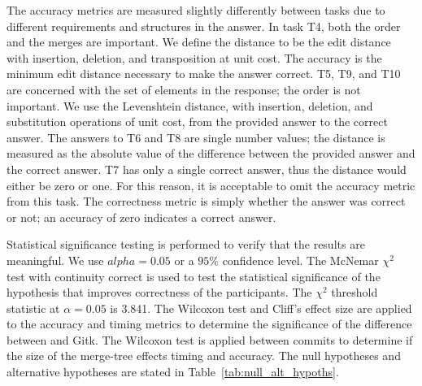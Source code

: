 The accuracy metrics are measured slightly differently between tasks due
to different requirements and structures in the answer. In task T4, both
the order and the merges are important. We define the distance to be the
edit distance with insertion, deletion, and transposition at unit cost.
The accuracy is the minimum edit distance necessary to make the answer
correct. T5, T9, and T10 are concerned with the set of elements in the
response; the order is not important. We use the Levenshtein distance,
with insertion, deletion, and substitution operations of unit cost, from
the provided answer to the correct answer. The answers to T6 and T8 are
single number values; the distance is measured as the absolute value of
the difference between the provided answer and the correct answer. T7
has only a single correct answer, thus the distance would either be zero
or one. For this reason, it is acceptable to omit the accuracy metric
from this task. The correctness metric is simply whether the answer was
correct or not; an accuracy of zero indicates a correct answer.

Statistical significance testing is performed to verify that the results
are meaningful. We use $alpha = 0.05$ or a $95\%$ confidence level. The
McNemar $\chi^2$ test\cite{McNemar1947} with continuity correct is used
to test the statistical significance of the hypothesis that \tool
improves correctness of the participants. The $\chi^2$ threshold
statistic at $\alpha = 0.05$ is 3.841. The Wilcoxon\cite{Wilcoxon45}
test and Cliff's effect size\cite{Cliff93} are applied to the accuracy
and timing metrics to determine the significance of the difference
between \tool and Gitk. The Wilcoxon test is applied between commits to
determine if the size of the merge-tree effects timing and accuracy. The
null hypotheses and alternative hypotheses are stated in
Table~\ref{tab:null_alt_hypoths}.


